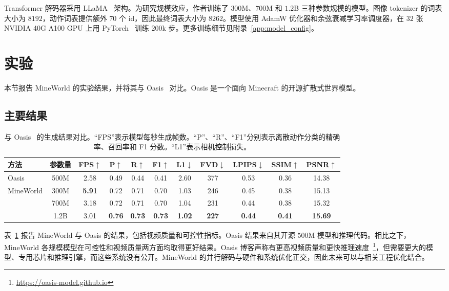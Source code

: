 \documentclass{article} %
\begin{document}
Transformer 解码器采用 LLaMA~\citep{touvron2023llama} 架构。为研究规模效应，作者训练了 $300$M、$700$M 和 $1.2$B 三种参数规模的模型。图像 tokenizer 的词表大小为 $8192$，动作词表提供额外 $70$ 个 id，因此最终词表大小为 $8262$。模型使用 AdamW 优化器和余弦衰减学习率调度器，在 $32$ 张 NVIDIA 40G A100 GPU 上用 PyTorch~\citep{paszke2019pytorch} 训练 $200$k 步。更多训练细节见附录~\ref{app:model_config}。


\section{实验}
\label{sec:exp}

本节报告 MineWorld 的实验结果，并将其与 Oasis~\citep{oasis2024} 对比。Oasis 是一个面向 Minecraft 的开源扩散式世界模型。

\subsection{主要结果}

\begin{table}[tb]
\begin{center}
\small
\caption{与 Oasis~\citep{oasis2024} 的生成结果对比。“FPS”表示模型每秒生成帧数。“P”、“R”、“F1”分别表示离散动作分类的精确率、召回率和 F1 分数。“L1”表示相机控制损失。}
	\label{tab:main_results}
        \setlength\tabcolsep{6pt}
	\begin{tabular}{lc|c|cccc|cccc}
		\toprule[1pt]
		方法&参数量&FPS$\uparrow$ & P$\uparrow$ & R$\uparrow$ & F1$\uparrow$ & L1$\downarrow$ &FVD$\downarrow$ &LPIPS$\downarrow$ &SSIM$\uparrow$ &PSNR$\uparrow$ \\
		\midrule
		Oasis& 500M & 2.58 & 0.49 & 0.44 & 0.41 & 2.60 & 377 & 0.53 & 0.36 & 14.38 \\ 
        \midrule
		\multirow{3}{*}{MineWorld} & 300M & \textbf{5.91} & 0.72 & 0.71 & 0.70 & 1.03 & 246 & 0.45 & 0.38 & 15.13  \\
		       & 700M & 3.18 & 0.72 & 0.71  & 0.70 & 1.04 & 231 & 0.44 & 0.38 & 15.32  \\
		       & 1.2B & 3.01 & \textbf{0.76} & \textbf{0.73} & \textbf{0.73} & \textbf{1.02}  &  \textbf{227} & \textbf{0.44} & \textbf{0.41} & \textbf{15.69}   \\
		\bottomrule[1pt]
	\end{tabular}
 \vspace{-3mm}
\end{center}
\end{table}

表~\ref{tab:main_results} 报告 MineWorld 与 Oasis 的结果，包括视频质量和可控性指标。Oasis 结果来自其开源 $500$M 模型和推理代码。相比之下，MineWorld 各规模模型在可控性和视频质量两方面均取得更好结果。Oasis 博客声称有更高视频质量和更快推理速度~\footnote{\url{https://oasis-model.github.io}}，但需要更大的模型、专用芯片和推理引擎，而这些系统没有公开。MineWorld 的并行解码与硬件和系统优化正交，因此未来可以与相关工程优化结合。
\end{document}
